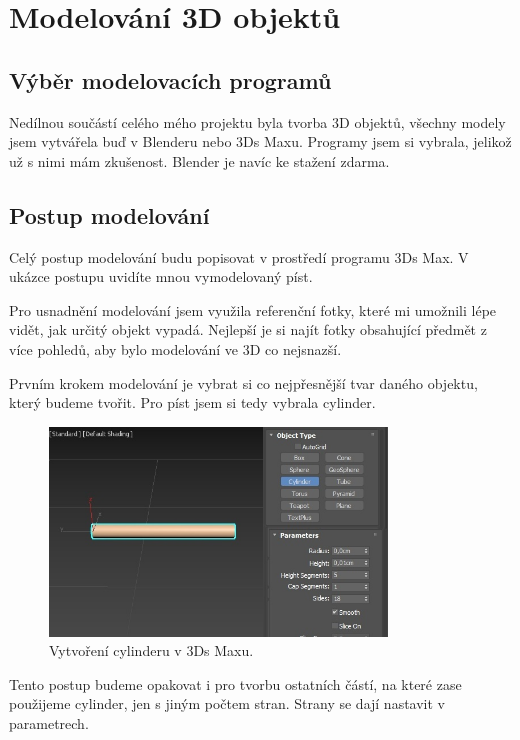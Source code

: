 \documentclass[12pt, a4paper,
twoside,        %
openright
]{report}
\let\oldchapter\chapter
\renewcommand{\chapter}{
	\clearpage
	\pagestyle{fancy}
	\oldchapter
}
\begin{document}
	

\chapter {Modelování 3D objektů}



\section {Výběr modelovacích programů}
\label{vyber_modelovacich_programu}
Nedílnou součástí celého mého projektu byla tvorba 3D objektů, všechny modely jsem vytvářela buď v Blenderu nebo 3Ds Maxu. Programy jsem si vybrala, jelikož už s nimi mám zkušenost. Blender je navíc ke stažení zdarma. 

\section {Postup modelování}
Celý postup modelování budu popisovat v prostředí programu 3Ds Max. V ukázce postupu uvidíte mnou vymodelovaný píst.

Pro usnadnění modelování jsem využila referenční fotky, které mi umožnili lépe vidět, jak určitý objekt vypadá. Nejlepší je si najít fotky obsahující předmět z více pohledů, aby bylo modelování ve 3D co nejsnazší.  

Prvním krokem modelování je vybrat si co nejpřesnější tvar daného objektu, který budeme tvořit. Pro píst jsem si tedy vybrala cylinder.  

\begin{figure}[h!]
	\centering 
	\includegraphics[width=0.8\textwidth]{image/modelovani.jpg} 
	\caption{Vytvoření cylinderu v 3Ds Maxu.} 
	\label{fig:modelovani_cast1} 
\end{figure}



Tento postup budeme opakovat i pro tvorbu ostatních částí, na které zase použijeme cylinder, jen s jiným počtem stran. Strany se dají nastavit v parametrech. 
\end{document}
